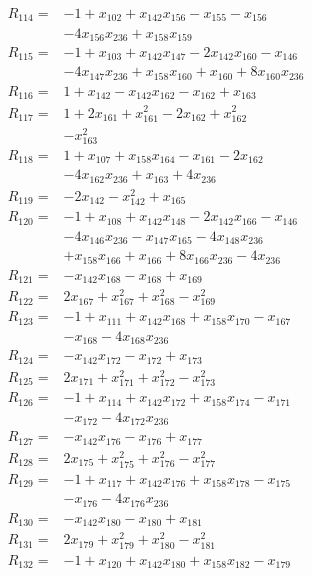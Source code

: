 \begin{align*}
R_{114}={}&-1 +x_{102} +x_{142}x_{156} -x_{155} -x_{156}\\
&-4x_{156}x_{236} +x_{158}x_{159}\\[3pt]
R_{115}={}&-1 +x_{103} +x_{142}x_{147} -2x_{142}x_{160} -x_{146}\\
&-4x_{147}x_{236} +x_{158}x_{160} +x_{160} +8x_{160}x_{236}\\[3pt]
R_{116}={}&1 +x_{142} -x_{142}x_{162} -x_{162} +x_{163}\\[3pt]
R_{117}={}&1 +2x_{161} +x_{161}^{2} -2x_{162} +x_{162}^{2}\\
&-x_{163}^{2}\\[3pt]
R_{118}={}&1 +x_{107} +x_{158}x_{164} -x_{161} -2x_{162}\\
&-4x_{162}x_{236} +x_{163} +4x_{236}\\[3pt]
R_{119}={}&-2x_{142} -x_{142}^{2} +x_{165}\\[3pt]
R_{120}={}&-1 +x_{108} +x_{142}x_{148} -2x_{142}x_{166} -x_{146}\\
&-4x_{146}x_{236} -x_{147}x_{165} -4x_{148}x_{236}\\
&+x_{158}x_{166} +x_{166} +8x_{166}x_{236} -4x_{236}\\[3pt]
R_{121}={}&-x_{142}x_{168} -x_{168} +x_{169}\\[3pt]
R_{122}={}&2x_{167} +x_{167}^{2} +x_{168}^{2} -x_{169}^{2}\\[3pt]
R_{123}={}&-1 +x_{111} +x_{142}x_{168} +x_{158}x_{170} -x_{167}\\
&-x_{168} -4x_{168}x_{236}\\[3pt]
R_{124}={}&-x_{142}x_{172} -x_{172} +x_{173}\\[3pt]
R_{125}={}&2x_{171} +x_{171}^{2} +x_{172}^{2} -x_{173}^{2}\\[3pt]
R_{126}={}&-1 +x_{114} +x_{142}x_{172} +x_{158}x_{174} -x_{171}\\
&-x_{172} -4x_{172}x_{236}\\[3pt]
R_{127}={}&-x_{142}x_{176} -x_{176} +x_{177}\\[3pt]
R_{128}={}&2x_{175} +x_{175}^{2} +x_{176}^{2} -x_{177}^{2}\\[3pt]
R_{129}={}&-1 +x_{117} +x_{142}x_{176} +x_{158}x_{178} -x_{175}\\
&-x_{176} -4x_{176}x_{236}\\[3pt]
R_{130}={}&-x_{142}x_{180} -x_{180} +x_{181}\\[3pt]
R_{131}={}&2x_{179} +x_{179}^{2} +x_{180}^{2} -x_{181}^{2}\\[3pt]
R_{132}={}&-1 +x_{120} +x_{142}x_{180} +x_{158}x_{182} -x_{179}\\

\end{align*}
